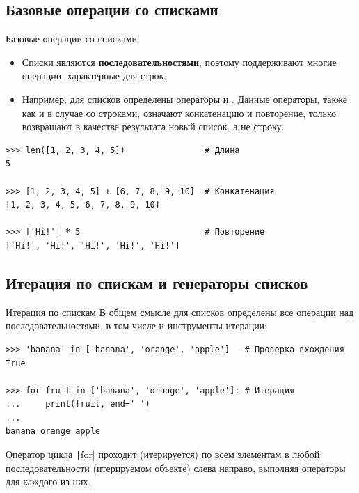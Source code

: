 \documentclass[aspectratio=169, mathserif]{beamer}%
\begin{document}
\subsection{Базовые операции со списками}

\begin{frame}[fragile]{Базовые операции со списками}
\scriptsize
\begin{itemize}
\item Списки являются \textcolor{extraorange}{\textbf{последовательностями}}, поэтому поддерживают многие операции, характерные для строк. 

\item Например, для списков определены операторы \pythoninline{+} и \pythoninline{*}. Данные операторы, также как и в случае со строками, означают конкатенацию и повторение, только возвращают в качестве результата новый список, а не строку.
\end{itemize}

\begin{verbatim}
>>> len([1, 2, 3, 4, 5])                # Длина
5

>>> [1, 2, 3, 4, 5] + [6, 7, 8, 9, 10]  # Конкатенация
[1, 2, 3, 4, 5, 6, 7, 8, 9, 10]

>>> ['Hi!'] * 5                         # Повторение
['Hi!', 'Hi!', 'Hi!', 'Hi!', 'Hi!']
\end{verbatim}
\vfill
\end{frame}


\subsection{Итерация по спискам и генераторы списков}

\begin{frame}[fragile]{Итерация по спискам}
\scriptsize
В общем смысле для списков определены все операции над последовательностями, в том числе и инструменты итерации:

\begin{verbatim}
>>> 'banana' in ['banana', 'orange', 'apple']   # Проверка вхождения
True

>>> for fruit in ['banana', 'orange', 'apple']: # Итерация
...     print(fruit, end=' ')
...
banana orange apple
\end{verbatim}

Оператор цикла \texttt|for| проходит (итерируется) по всем элементам в любой последовательности (итерируемом объекте) слева направо, выполняя операторы для каждого из них.
\vfill
\end{frame}
\end{document}
